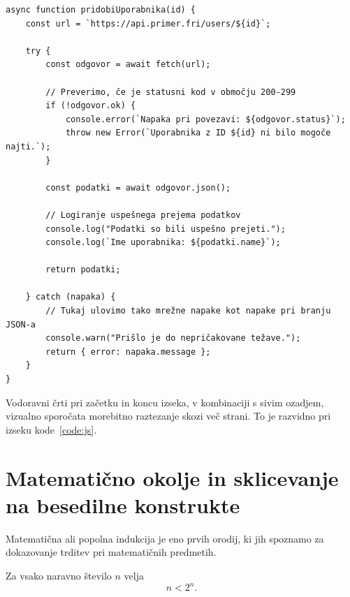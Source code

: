 \documentclass[a4paper,12pt,openright]{book}
\begin{document}
\begin{center}

\begin{verbatim}
async function pridobiUporabnika(id) {
    const url = `https://api.primer.fri/users/${id}`;
    
    try {
        const odgovor = await fetch(url);
        
        // Preverimo, če je statusni kod v območju 200-299
        if (!odgovor.ok) {
            console.error(`Napaka pri povezavi: ${odgovor.status}`);
            throw new Error(`Uporabnika z ID ${id} ni bilo mogoče najti.`);
        }

        const podatki = await odgovor.json();
        
        // Logiranje uspešnega prejema podatkov
        console.log("Podatki so bili uspešno prejeti.");
        console.log(`Ime uporabnika: ${podatki.name}`);
        
        return podatki;
        
    } catch (napaka) {
        // Tukaj ulovimo tako mrežne napake kot napake pri branju JSON-a
        console.warn("Prišlo je do nepričakovane težave.");
        return { error: napaka.message };
    }
}
\end{verbatim}
\label{code:js}
\end{center}

Vodoravni črti pri začetku in koncu izseka, v kombinaciji s sivim ozadjem, vizualno sporočata morebitno raztezanje skozi več strani. To je razvidno pri izseku kode~\ref{code:js}.

\chapter{Matematično okolje in sklicevanje na besedilne konstrukte}
\label{ch:mat}

Matematična ali popolna indukcija je eno prvih orodij, ki jih spoznamo za dokazovanje trditev pri matematičnih predmetih.
\begin{izrek}
  \label{iz:1}
  Za vsako naravno število $n$ velja
  \begin{equation}
    n < 2^n.
    \label{eq:1}
  \end{equation}
\end{izrek}
\end{document}
